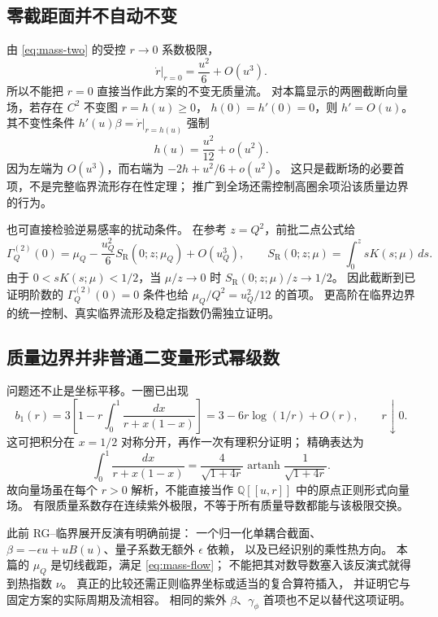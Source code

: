 \documentclass[11pt,a4paper]{ctexart}
\theoremstyle{cnplain}
\theoremstyle{remark}\newtheorem{remark}[theorem]{注}
\newcommand{\Q}{\mathbb Q}
\newcommand{\SR}{S_{\mathrm R}}
\begin{document}
\subsection{零截距面并不自动不变}
由 \eqref{eq:mass-two} 的受控 $r\to0$ 系数极限，
\begin{equation}\label{eq:r-zero}
 \left.\dot r\right|_{r=0}
 =\frac{u^2}{6}+O(u^3).
\end{equation}
所以不能把 $r=0$ 直接当作此方案的不变无质量流。
对本篇显示的两圈截断向量场，若存在 $C^2$ 不变图 $r=h(u)\geq0$，
$h(0)=h'(0)=0$，则 $h'=O(u)$。
其不变性条件
$h'(u)\beta=\dot r|_{r=h(u)}$ 强制
\begin{equation}\label{eq:critical-graph}
 h(u)=\frac{u^2}{12}+o(u^2).
\end{equation}
因为左端为 $O(u^3)$，而右端为 $-2h+u^2/6+o(u^2)$。
这只是截断场的必要首项，不是完整临界流形存在性定理；
推广到全场还需控制高圈余项沿该质量边界的行为。

也可直接检验逆易感率的扰动条件。
在参考 $z=Q^2$，前批二点公式给
\[
 \Gamma_Q^{(2)}(0)=\mu_Q-\frac{u_Q^2}{6}\SR(0;z;\mu_Q)+O(u_Q^3),
 \qquad
 \SR(0;z;\mu)=\int_0^z sK(s;\mu)\,ds.
\]
由于 $0<sK(s;\mu)<1/2$，当 $\mu/z\to0$ 时
$\SR(0;z;\mu)/z\to1/2$。
因此截断到已证明阶数的 $\Gamma_Q^{(2)}(0)=0$ 条件也给
$\mu_Q/Q^2=u_Q^2/12$ 的首项。
更高阶在临界边界的统一控制、真实临界流形及稳定指数仍需独立证明。

\subsection{质量边界并非普通二变量形式幂级数}
问题还不止是坐标平移。一圈已出现
\begin{equation}\label{eq:b1-nonanalytic}
 b_1(r)=3\left[1-r\int_0^1\frac{dx}{r+x(1-x)}\right]
       =3-6r\log(1/r)+O(r),\qquad r\downarrow0.
\end{equation}
这可把积分在 $x=1/2$ 对称分开，再作一次有理积分证明；
精确表达为
\[
 \int_0^1\frac{dx}{r+x(1-x)}
 =\frac4{\sqrt{1+4r}}
       \operatorname{artanh}\frac1{\sqrt{1+4r}}.
\]
故向量场虽在每个 $r>0$ 解析，不能直接当作
$\Q[[u,r]]$ 中的原点正则形式向量场。
有限质量系数存在连续紫外极限，不等于所有质量导数都能与该极限交换。

此前 RG--临界展开反演有明确前提：
一个归一化单耦合截面、
$\beta=-\epsilon u+uB(u)$、量子系数无额外 $\epsilon$ 依赖，
以及已经识别的乘性热方向。
本篇的 $\mu_Q$ 是切线截距，满足 \eqref{eq:mass-flow}；
不能把其对数导数塞入该反演式就得到热指数 $\nu$。
真正的比较还需正则临界坐标或适当的复合算符插入，
并证明它与固定方案的实际周期及流相容。
相同的紫外 $\beta$、$\gamma_\phi$ 首项也不足以替代这项证明。
\end{document}
